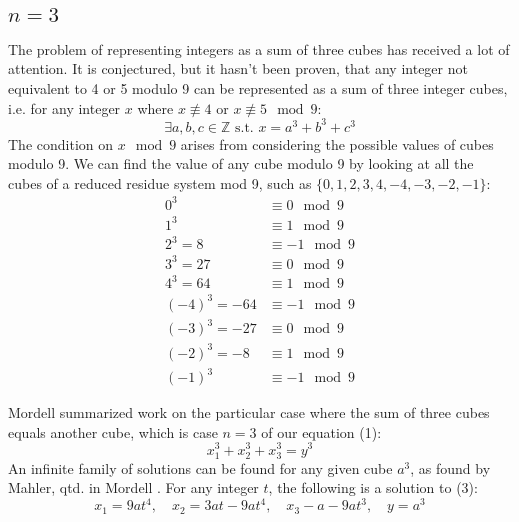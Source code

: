\documentclass{article}
\newcommand{\q}{\quad}
\begin{document}
\begin{flushleft}
\subsection{$n=3$}
The problem of representing integers as a sum of three cubes has received a lot of attention. It is conjectured, but it hasn't been proven, that any integer not equivalent to 4 or 5 modulo 9 can be represented as a sum of three integer cubes, i.e. for any integer $x$ where $x \not\equiv 4$ or $x \not\equiv 5 \mod 9$:
\begin{equation}
    \exists a, b, c \in \mathbb{Z} \text{ s.t. } x=a^3+b^3+c^3
\end{equation}
The condition on $x \mod 9$ arises from considering the possible values of cubes modulo 9. We can find the value of any cube modulo 9 by looking at all the cubes of a reduced residue system mod 9, such as $\{0, 1, 2, 3, 4, -4, -3, -2, -1\}$:
\begin{align*}
    0^3 &\equiv 0 \mod 9 \\
    1^3 &\equiv 1 \mod 9 \\
    2^3=8 &\equiv -1 \mod 9 \\
    3^3=27 &\equiv 0 \mod 9 \\
    4^3 =64 &\equiv 1 \mod 9 \\
    (-4)^3 = -64 &\equiv -1 \mod 9 \\
    (-3)^3 =-27&\equiv 0 \mod 9 \\
    (-2)^3 = -8 &\equiv 1 \mod 9 \\
    (-1)^3 &\equiv -1 \mod 9 
\end{align*}


Mordell \cite{mordell} summarized work on the particular case where the sum of three cubes equals another cube, which is case $n=3$ of our equation (1): 
\begin{equation}
    x_1^3 + x_2^3 + x_3^3 = y^3
\end{equation}
An infinite family of solutions can be found for any given cube $a^3$, as found by Mahler, qtd. in Mordell \cite{mordell}. For any integer $t$, the following is a solution to (3):
\begin{equation*}
    x_1 = 9at^4, \q x_2=3at-9at^4, \q x_3 - a-9at^3, \q y=a^3
\end{equation*}

\end{flushleft}
\end{document}
